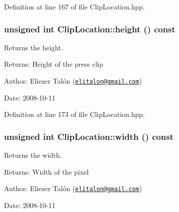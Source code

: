 Definition at line 167 of file ClipLocation.hpp.\hypertarget{class_clip_location_8484a9c0483766baff2c11069290da79}{
\subsubsection[height]{\setlength{\rightskip}{0pt plus 5cm}unsigned int ClipLocation::height () const}}
\label{class_clip_location_8484a9c0483766baff2c11069290da79}


Returns the height. 

\begin{Desc}
\item[Returns:]Height of the press clip\end{Desc}
\begin{Desc}
\item[Author:]Eliezer Talón (\href{mailto:elitalon@gmail.com}{\tt elitalon@gmail.com}) \end{Desc}
\begin{Desc}
\item[Date:]2008-10-11 \end{Desc}


Definition at line 173 of file ClipLocation.hpp.\hypertarget{class_clip_location_880badb9dceecb7878a08b7bdc5a4287}{
\subsubsection[width]{\setlength{\rightskip}{0pt plus 5cm}unsigned int ClipLocation::width () const}}
\label{class_clip_location_880badb9dceecb7878a08b7bdc5a4287}


Returns the width. 

\begin{Desc}
\item[Returns:]Width of the pixel\end{Desc}
\begin{Desc}
\item[Author:]Eliezer Talón (\href{mailto:elitalon@gmail.com}{\tt elitalon@gmail.com}) \end{Desc}
\begin{Desc}
\item[Date:]2008-10-11 \end{Desc}


